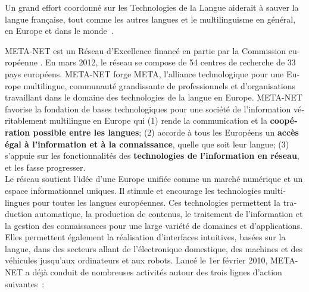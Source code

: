 \begin{french}
\begin{multicols}{2}
Un grand effort coordonné sur les Technologies de la Langue aiderait à
sauver la langue française, tout comme les autres langues et le
multilinguisme en général, en Europe et dans le monde~\cite{worldconclusion}.

\end{multicols}

\clearpage


\vspace{-5mm}
\begin{multicols}{2}
META-NET est un Réseau d'Excellence financé en partie par la Commission européenne \cite{rehm2011}. 
En mars 2012, le réseau se compose de 54 centres de recherche de 33 pays européens. META-NET forge META, l’alliance technologique pour une Europe multilingue, communauté grandissante de professionnels et d’organisations travaillant dans le domaine des technologies de la langue en Europe. META-NET favorise la fondation de bases technologiques pour une société de l'information véritablement multilingue en Europe qui 
(1) rende la communication et la {\bf coopération possible entre les langues};
(2) accorde à tous les Européens un {\bf accès égal à l'information et à la connaissance}, quelle que soit leur langue; 
(3) s'appuie sur les fonctionnalités des {\bf technologies de l'information en réseau}, et les fasse progresser.\\
Le réseau soutient l’idée d’une Europe unifiée comme un marché numérique et un espace informationnel uniques. Il stimule et encourage les technologies multilingues pour toutes les langues européennes. Ces technologies permettent la traduction automatique, la production de contenus, le traitement de l'information et la gestion des connaissances pour une large variété de domaines et d’applications. Elles permettent également la réalisation d’interfaces intuitives, basées sur la langue, dans des secteurs allant de l'électronique domestique, des machines et des véhicules jusqu’aux ordinateurs et aux robots. Lancé le 1er février 2010, META-NET a déjà conduit de nombreuses activités autour des trois lignes d'action suivantes~:


\end{multicols}
\end{french}
